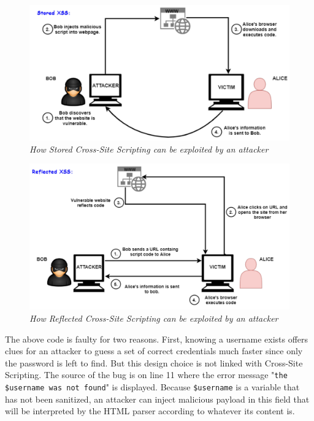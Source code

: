 \begin{figure}[ht]
 \centering
 \captionsetup{justification=centering}
 \includegraphics[width=\linewidth]{figures/storedxss.pdf}
 \caption[How Stored Cross-Site Scripting can be exploited by an attacker]{\textit{How Stored Cross-Site Scripting can be exploited by an attacker}}
 \label{fig:storedxss}
\end{figure}

\begin{figure}[ht]
 \centering
 \captionsetup{justification=centering}
 \includegraphics[width=\linewidth]{figures/reflectedxss.pdf}
 \caption[How Reflected Cross-Site Scripting can be exploited by an attacker]{\textit{How Reflected Cross-Site Scripting can be exploited by an attacker}}
 \label{fig:reflectedxss}
\end{figure}

The above code is faulty for two reasons. First, knowing a username exists offers clues for an attacker to guess a set of correct credentials much faster since only the password is left to find. But this design choice is not linked with Cross-Site Scripting. The source of the bug is on line 11 where the error message "{\tt the \$username was not found}" is displayed. Because {\tt \$username} is a variable that has not been sanitized, an attacker can inject malicious payload in this field that will be interpreted by the HTML parser according to whatever its content is. 

